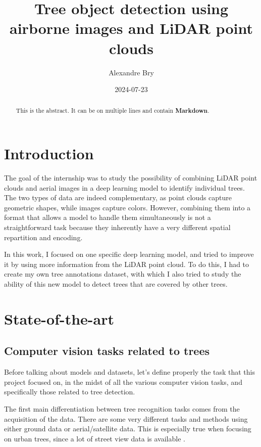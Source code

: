 \documentclass[
  letterpaper,
  DIV=11,
  numbers=noendperiod]{scrartcl}
\title{Tree object detection using airborne images and LiDAR point
clouds}
\author{Alexandre Bry}
\date{2024-07-23}
\renewcommand*\contentsname{Table of contents}
\newcommand\contentsname{Table of contents}
\begin{document}
\maketitle
\begin{abstract}
This is the abstract. It can be on multiple lines and contain
\textbf{Markdown}.
\end{abstract}

\renewcommand*\contentsname{Table of contents}
{
\hypersetup{linkcolor=}
\setcounter{tocdepth}{3}
\tableofcontents
}

\section*{Introduction}\label{introduction}

The goal of the internship was to study the possibility of combining
LiDAR point clouds and aerial images in a deep learning model to
identify individual trees. The two types of data are indeed
complementary, as point clouds capture geometric shapes, while images
capture colors. However, combining them into a format that allows a
model to handle them simultaneously is not a straightforward task
because they inherently have a very different spatial repartition and
encoding.

In this work, I focused on one specific deep learning model, and tried
to improve it by using more information from the LiDAR point cloud. To
do this, I had to create my own tree annotations dataset, with which I
also tried to study the ability of this new model to detect trees that
are covered by other trees.

\section{State-of-the-art}\label{state-of-the-art}

\subsection{Computer vision tasks related to
trees}\label{computer-vision-tasks-related-to-trees}

Before talking about models and datasets, let's define properly the task
that this project focused on, in the midst of all the various computer
vision tasks, and specifically those related to tree detection.

The first main differentiation between tree recognition tasks comes from
the acquisition of the data. There are some very different tasks and
methods using either ground data or aerial/satellite data. This is
especially true when focusing on urban trees, since a lot of street view
data is available \autocite{urban-trees}.
\end{document}
